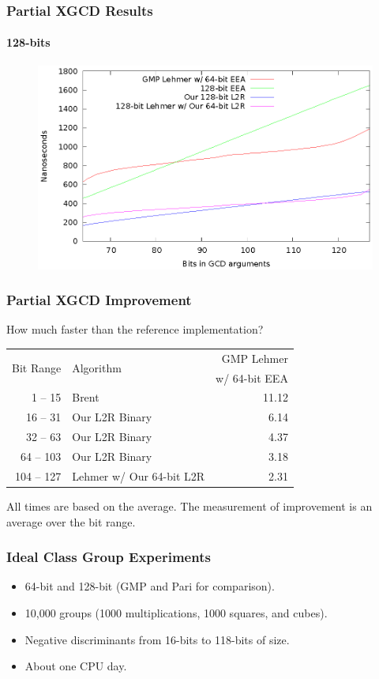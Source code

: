 \documentclass{beamer}
\newcommand{\smallfont}{\fontsize{6pt}{7.2}\selectfont}
\begin{document}
\begin{frame}
\frametitle{Partial XGCD Results}
\framesubtitle{128-bits}
\begin{figure}
\includegraphics[scale=0.86]{best-partial-128}
\end{figure}
\end{frame}

\begin{frame}
\frametitle{Partial XGCD Improvement}
How much faster than the reference implementation?
\begin{table}
\centering
\begin{tabular}{ | r | l | r | }
\hline
\multirow{2}{*}{Bit Range} & \multirow{2}{*}{Algorithm} & GMP Lehmer \\
& & w/ 64-bit EEA \\
\hline
1 -- 15 & Brent & 11.12 \\
16 -- 31 & Our L2R Binary & 6.14 \\
32 -- 63 & Our L2R Binary & 4.37 \\
64 -- 103 & Our L2R Binary & 3.18 \\
104 -- 127 & Lehmer w/ Our 64-bit L2R & 2.31 \\
\hline
\end{tabular}
\end{table}

\bigskip
\smallfont
All times are based on the average.  The measurement of improvement is an average over the bit range.

\end{frame}


\begin{frame}
\frametitle{Ideal Class Group Experiments}
\begin{itemize}
\item 64-bit and 128-bit (GMP and Pari for comparison).
\item 10,000 groups (1000 multiplications, 1000 squares, and  cubes).
\item Negative discriminants from 16-bits to 118-bits of size.
\item About one CPU day.
\end{itemize}
\end{frame}
\end{document}
